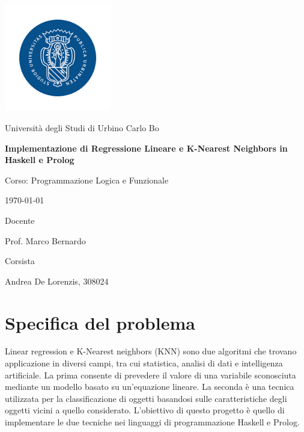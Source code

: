\documentclass[11pt]{article}
\newcommand{\titlestr}{Implementazione di Regressione Lineare e K-Nearest Neighbors in Haskell e Prolog}
\newcommand{\subtitlestr}{Corso: Programmazione Logica e Funzionale}
\newcommand{\labelStudente}{Corsista}
\newcommand{\labelDocente}{Docente}
\newcommand{\authorstr}{Andrea De Lorenzis, 308024}
\newcommand{\profstr}{Prof. Marco Bernardo}
\theoremstyle{definition}
\begin{document}
\begin{titlepage}
  \centering
  \includegraphics[width=0.35\textwidth]{imgs/logo_uniurb.png}
  \centerline {\small Università degli Studi di Urbino Carlo Bo}
  
    \vspace{1cm}
  {\LARGE \bf{\titlestr} \par}
  {\vspace{0.5cm}}
  {\Large \subtitlestr \par}
  \vspace{0.5cm}
   {\large \today}    
  \vspace{1.5cm}
  
  \begin{multicols}{2}
  \flushleft
  {\Large \labelDocente \par}
  {\vspace{0.2cm}}
  {\Large \profstr \par}
  {\vspace{1.5cm}}  
   \flushright
  {\Large \labelStudente \par}
  {\vspace{0.2cm}}
  { \Large\authorstr \par}
  \end{multicols}

  \vfill
\end{titlepage}

\newpage

{
  \hypersetup{linkcolor=black}
  \tableofcontents
}

\newpage

\section{Specifica del problema}
Linear regression e K-Nearest neighbors (KNN) sono due algoritmi che trovano applicazione in diversi campi, tra cui statistica, analisi di dati e intelligenza artificiale. La prima consente di prevedere il valore di una variabile sconosciuta mediante un modello basato su un'equazione lineare. La seconda è una tecnica utilizzata per la classificazione di oggetti basandosi sulle caratteristiche degli oggetti vicini a quello considerato. L'obiettivo di questo progetto è quello di implementare le due tecniche nei linguaggi di programmazione Haskell e Prolog. 
\end{document}

